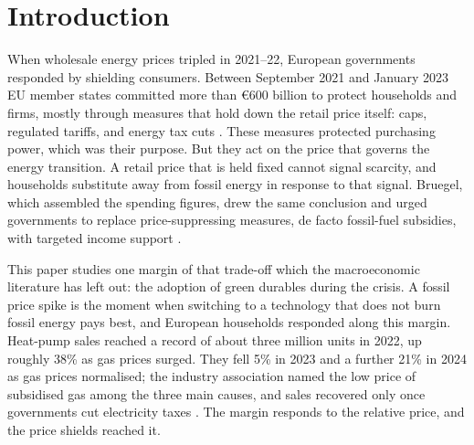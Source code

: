 %

\section{Introduction}\label{sec:intro}

When wholesale energy prices tripled in 2021--22, European governments responded
by shielding consumers. Between September 2021 and January 2023 EU member states
committed more than \euro{}600 billion to protect households and firms, mostly
through measures that hold down the retail price itself: caps, regulated tariffs,
and energy tax cuts \citep{Bruegel2023}. These measures protected purchasing
power, which was their purpose. But they act on the price that governs the energy
transition. A retail price that is held fixed cannot signal scarcity, and
households substitute away from fossil energy in response to that signal.
Bruegel, which assembled the spending figures, drew the same conclusion and urged
governments to replace price-suppressing measures, de facto fossil-fuel
subsidies, with targeted income support \citep{Bruegel2023}.

This paper studies one margin of that trade-off which the macroeconomic
literature has left out: the adoption of green durables during the crisis. A
fossil price spike is the moment when switching to a technology that
does not burn fossil energy pays best, and European households responded along
this margin. Heat-pump sales reached a record of about three million units in
2022, up roughly 38\% as gas prices surged. They fell 5\% in 2023 and a further
21\% in 2024 as gas prices normalised; the industry association named the low
price of subsidised gas among the three main causes, and sales recovered only
once governments cut electricity taxes \citep{EHPA2023,EHPA2024,EHPA2025}. The
margin responds to the relative price, and the price shields reached it.

